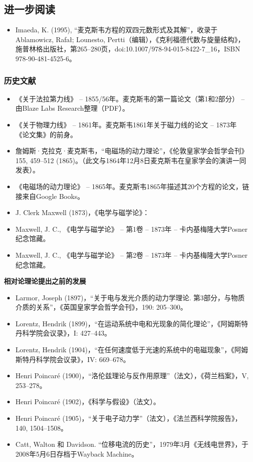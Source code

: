 \subsection{进一步阅读}
\begin{itemize}
\item Imaeda, K. (1995), “麦克斯韦方程的双四元数形式及其解”，收录于Ablamowicz, Rafał; Lounesto, Pertti（编辑），《克利福德代数与旋量结构》，施普林格出版社，第265–280页，doi:10.1007/978-94-015-8422-7_16，ISBN 978-90-481-4525-6。
\end{itemize}
\subsubsection{历史文献}

\begin{itemize}
\item 《关于法拉第力线》 – 1855/56年。麦克斯韦的第一篇论文（第1和2部分） – 由Blaze Labs Research整理（PDF）。
\item 《关于物理力线》 – 1861年。麦克斯韦1861年关于磁力线的论文 – 1873年《论文集》的前身。
\item  詹姆斯·克拉克·麦克斯韦，“电磁场的动力理论”，《伦敦皇家学会哲学会刊》155, 459–512 (1865)。（此文与1864年12月8日麦克斯韦在皇家学会的演讲一同发表）。
\item 《电磁场的动力理论》 – 1865年。麦克斯韦1865年描述其20个方程的论文，链接来自Google Books。
\item J. Clerk Maxwell (1873)，《电学与磁学论》：
\item Maxwell, J. C., 《电学与磁学论》 – 第1卷 – 1873年 – 卡内基梅隆大学Posner纪念馆藏。
\item Maxwell, J. C., 《电学与磁学论》 – 第2卷 – 1873年 – 卡内基梅隆大学Posner纪念馆藏。
\end{itemize}
\textbf{相对论理论提出之前的发展}

\begin{itemize}
\item Larmor, Joseph (1897)，“关于电与发光介质的动力学理论. 第3部分，与物质介质的关系”，《英国皇家学会哲学会刊》，190: 205–300。
\item Lorentz, Hendrik (1899)，“在运动系统中电和光现象的简化理论”，《阿姆斯特丹科学院会议录》，I: 427–443。
\item Lorentz, Hendrik (1904)，“在任何速度低于光速的系统中的电磁现象”，《阿姆斯特丹科学院会议录》，IV: 669–678。
\item Henri Poincaré (1900)，“洛伦兹理论与反作用原理”（法文），《荷兰档案》，V, 253–278。
\item Henri Poincaré (1902)，《科学与假设》（法文）。
\item Henri Poincaré (1905)，“关于电子动力学”（法文），《法兰西科学院报告》，140, 1504–1508。
\item Catt, Walton 和 Davidson. “位移电流的历史”，1979年3月《无线电世界》，于2008年5月6日存档于Wayback Machine。
\end{itemize}
